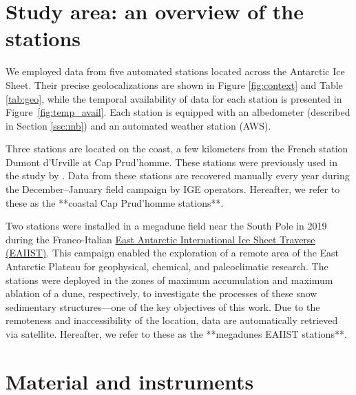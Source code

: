 \documentclass[11pt,a4paper]{article}
\begin{document}
	\section{Study area: an overview of the stations}

We employed data from five automated stations located across the Antarctic Ice Sheet. Their precise geolocalizations are shown in Figure \ref{fig:context} and Table \ref{tab:geo}, while the temporal availability of data for each station is presented in Figure~\ref{fig:temp_avail}. Each station is equipped with an albedometer (described in Section \ref{ssc:mb}) and an automated weather station (AWS).

Three stations are located on the coast, a few kilometers from the French station Dumont d'Urville at Cap Prud'homme. These stations were previously used in the study by \cite{arioliDynamicsSnowGrain2023}. Data from these stations are recovered manually every year during the December--January field campaign by IGE operators. Hereafter, we refer to these as the **coastal Cap Prud'homme stations**.

Two stations were installed in a megadune field near the South Pole in 2019 during the Franco-Italian \href{https://ige-webprojet.univ-grenoble-alpes.fr/EAIIST/en/index.htm}{East Antarctic International Ice Sheet Traverse (EAIIST)}. This campaign enabled the exploration of a remote area of the East Antarctic Plateau for geophysical, chemical, and paleoclimatic research. The stations were deployed in the zones of maximum accumulation and maximum ablation of a dune, respectively, to investigate the processes of these snow sedimentary structures---one of the key objectives of this work. Due to the remoteness and inaccessibility of the location, data are automatically retrieved via satellite. Hereafter, we refer to these as the **megadunes EAIIST stations**.

	\section{Material and instruments}
	
\end{document}
